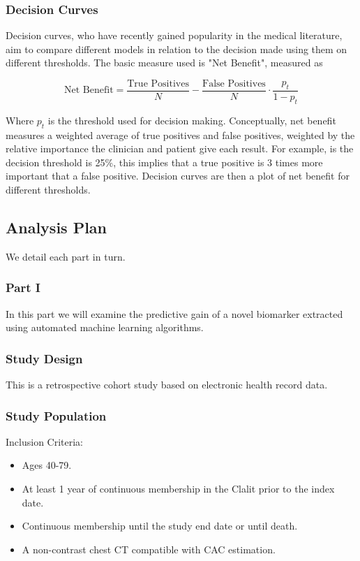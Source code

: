 \documentclass[a4paper,12pt]{article}
\begin{document}
		\subsubsection{Decision Curves}
		Decision curves, who have recently gained popularity in the medical literature\cite{Vickers2016}, aim to compare different models in relation to the decision made using them on different thresholds. The basic measure used is "Net Benefit", measured as
		
		\begin{equation*}
		\text{Net Benefit} = \frac{\text{True Positives}}{N} - \frac{\text{False Positives}}{N} \cdot \frac{p_t}{1-p_t}
		\end{equation*}
		
		Where $ p_t $ is the threshold used for decision making. Conceptually, net benefit measures a weighted average of true positives and false positives, weighted by the relative importance the clinician and patient give each result. For example, is the decision threshold is 25\%, this implies that a true positive is 3 times more important that a false positive. Decision curves are then a plot of net benefit for different thresholds.
		
	\subsection{Analysis Plan}
	We detail each part in turn.
	
		\subsubsection{Part I}
		In this part we will examine the predictive gain of a novel biomarker extracted using automated machine learning algorithms.
		
		\subsubsection*{Study Design}
		This is a retrospective cohort study based on electronic health record data.
		
		\subsubsection*{Study Population}
		Inclusion Criteria:
		\begin{itemize}
			\item Ages 40-79.
			\item At least 1 year of continuous membership in the Clalit prior to the index date.
			\item Continuous membership until the study end date or until death.
			\item A non-contrast chest CT compatible with CAC estimation.
		\end{itemize}
		
\end{document}
